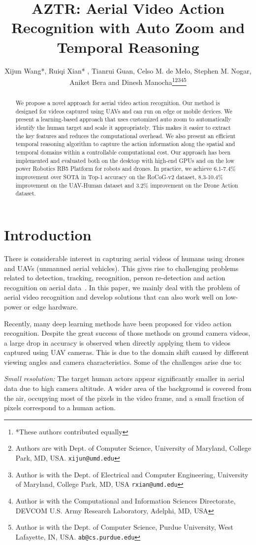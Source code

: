\documentclass[letterpaper, 10 pt, conference]{ieeeconf}
\title{\LARGE \bf
AZTR: Aerial Video Action Recognition with Auto Zoom and Temporal Reasoning
}
\author{Xijun Wang*, Ruiqi Xian* , Tianrui Guan, Celso M. de Melo, Stephen M. Nogar,\\ Aniket Bera and Dinesh Manocha\thanks{*These authors contributed equally}\thanks{Authors are with Dept. of Computer Science, University of Maryland, College Park, MD, USA.
        {\tt\small xijun@umd.edu}}\thanks{Author is with the Dept. of Electrical and Computer Engineering, University of Maryland, College Park, MD, USA
        {\tt\small rxian@umd.edu}}\thanks{Author is with the Computational and Information Sciences Directorate, DEVCOM U.S. Army Research Laboratory, Adelphi, MD, USA
        }\thanks{Author is with the Dept. of Computer Science, Purdue University, West Lafayette, IN, USA.
        {\tt\small ab@cs.purdue.edu}}}
\begin{document}
\maketitle
\thispagestyle{empty}
\pagestyle{empty}



\begin{abstract}


We propose a novel approach for aerial video action recognition. Our method is designed for videos captured using UAVs and can run on edge or mobile devices. We present a learning-based approach that uses customized auto zoom to automatically identify the human target and scale it appropriately. This makes it easier to extract the key features and reduces the computational overhead. We also present an efficient temporal reasoning algorithm to capture the action information along the spatial and temporal domains within a controllable computational cost. Our approach has been implemented and evaluated both on the desktop with high-end GPUs and on the low power Robotics RB5 Platform for robots and drones. In practice, we achieve 6.1-7.4\% improvement over SOTA in Top-1 accuracy on the RoCoG-v2 dataset, 8.3-10.4\% improvement on the UAV-Human dataset and 3.2\% improvement on the Drone Action dataset.

\end{abstract}

 \section{Introduction}
\label{sec: introduction}
There is considerable interest in capturing aerial videos of humans using drones and UAVs (unmanned aerial vehicles). This gives rise to challenging problems related to detection, tracking, recognition, person re-detection and action recognition on aerial data~\cite{nguyen2022state}. In this paper, we mainly deal with the problem of aerial video recognition and develop solutions that can also work well on low-power or edge hardware.

Recently, many deep learning methods have been proposed for video action recognition. Despite the great success of those methods on ground camera videos, a large drop in accuracy is observed when directly applying them to videos captured using UAV cameras. This is due to the domain shift caused by different viewing angles and camera characteristics.
Some of the challenges arise due to:


 \textit{Small resolution:} The target human actors  appear significantly smaller in aerial data due to high camera altitude. A wider area of the background is covered from the air, occupying most of the pixels in the video frame, and a small fraction of pixels correspond to a human action.
 
\end{document}
